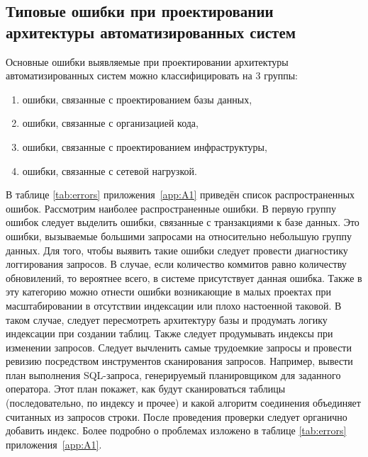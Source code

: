 \subsection{Типовые ошибки при проектировании архитектуры автоматизированных систем}\label{sec:ch1/sec5/sub2}
Основные ошибки выявляемые при проектировании архитектуры автоматизированных систем можно классифицировать на 3 группы:
\begin{enumerate}
    \item  ошибки, связанные с проектированием базы данных,
    \item  ошибки, связанные с организацией кода,
    \item  ошибки, связанные с проектированием инфраструктуры,
    \item  ошибки, связанные с сетевой нагрузкой.
\end{enumerate}
В таблице \cref{tab:errors} приложения~\cref{app:A1} приведён список распространенных ошибок.
Рассмотрим наиболее распространенные ошибки. В первую группу ошибок следует выделить ошибки, связанные с транзакциями к базе данных. Это ошибки, вызываемые большими запросами на относительно небольшую группу данных. Для того, чтобы выявить такие ошибки следует провести диагностику логгирования запросов. В случае, если количество коммитов равно количеству обновилений, то вероятнее всего, в системе присутствует данная ошибка. Также в эту категорию можно отнести ошибки возникающие в малых проектах при масштабировании в отсутствии индексации или плохо настоенной таковой. В таком случае, следует пересмотреть архитектуру базы и продумать логику индексации при создании таблиц. Также следует продумывать индексы при изменении запросов. Следует вычленить самые трудоемкие запросы и провести ревизию посредством инструментов сканирования запросов. Например, вывести план выполнения SQL-запроса, генерируемый планировщиком для заданного оператора. Этот план покажет, как будут сканироваться таблицы (последовательно, по индексу и прочее) и какой алгоритм соединения объединяет считанных из запросов строки. После проведения проверки следует органично добавить индекс. Более подробно о проблемах изложено в таблице \cref{tab:errors} приложения~\cref{app:A1}.

